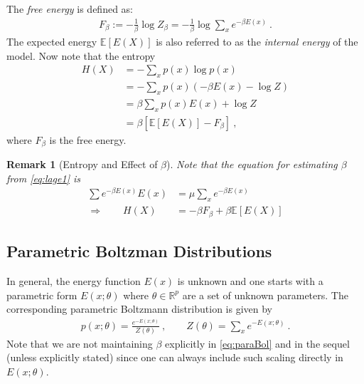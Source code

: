 \documentclass{article}
\newtheorem*{remark}{Remark}
\newcommand\R{\mathbb{R}}
\newcommand\E{\mathbb{E}}
\begin{document}


The {\em free energy} is defined as:
\begin{align}
	F_{\beta} := - \frac{1}{\beta} \log Z_{\beta} = - \frac{1}{\beta} \log \sum_{x} e^{-\beta E(x)}~. 
	\label{eq:free}
\end{align}
The expected energy $\E[E(X)]$ is also referred to as the {\em internal energy} of the model. Now note that the entropy
\begin{align*}
	H(X) & = - \sum_x p(x) \log p(x) \\
	& = - \sum_x p(x) ( - \beta E(x) - \log Z) \\
	& = \beta \sum_x p(x) E(x) + \log Z \\
	& = \beta \left[ \E[E(X)] - F_{\beta} \right]~,
\end{align*}
where $F_{\beta}$ is the free energy.


\begin{remark}[Entropy and Effect of $\beta$]
	Note that the equation for estimating $\beta$ from \eqref{eq:lage1} is
	\begin{align*}
		\sum e^{-\beta E(x)} E(x) & = \mu \sum_{x} e^{-\beta E(x)} \\
		\Rightarrow \qquad H(X) & = -\beta F_{\beta} + \beta \E[E(X)]
	\end{align*}
\end{remark}





\subsection{Parametric Boltzman Distributions}

In general, the energy function $E(x)$ is unknown and one starts with a parametric form $E(x;\theta)$ where $\theta \in \R^p$ are a set of unknown parameters. The corresponding parametric Boltzmann distribution is given by
\begin{align}
	p(x;\theta) = \frac{e^{- E(x;\theta)}}{Z(\theta)}~, \qquad Z(\theta) = \sum_{x} e^{-E(x;\theta)}~.
	\label{eq:paraBol}
\end{align}
Note that we are not maintaining $\beta$ explicitly in \eqref{eq:paraBol} and in the sequel (unless explicitly stated) since one can always include such scaling directly in $E(x;\theta)$.
\end{document}

